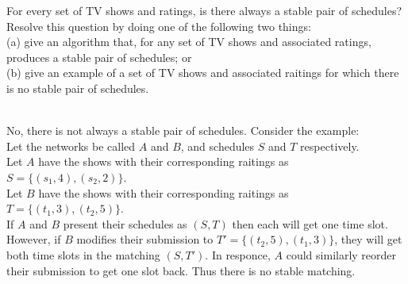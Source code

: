 \documentclass{assignment}
\begin{document}
\begin{problemlist}
\pbitem
\begin{problem}
For every set of TV shows and ratings, is there always a stable pair of schedules? Resolve this question by doing one of the following two things:\\
(a) give an algorithm that, for any set of TV shows and associated ratings, produces a stable pair of schedules; or\\
(b) give an example of a set of TV shows and associated raitings for which there is no stable pair of schedules.
\end{problem}
\begin{answer}
\\No, there is not always a stable pair of schedules. Consider the example:\\
Let the networks be called $A$ and $B$, and schedules $S$ and $T$ respectively.\\
Let $A$ have the shows with their corresponding raitings as $S=\{(s_1,4),(s_2,2)\}$.\\
Let $B$ have the shows with their corresponding raitings as $T=\{(t_1,3),(t_2,5)\}$.\\
If $A$ and $B$ present their schedules as $(S,T)$ then each will get one time slot. However, if $B$ modifies their submission to $T'=\{(t_2,5),(t_1,3)\}$, they will get both time slots in the matching $(S,T')$. In responce, $A$ could similarly reorder their submission to get one slot back. Thus there is no stable matching.
\end{answer}

\end{problemlist}
\end{document}
